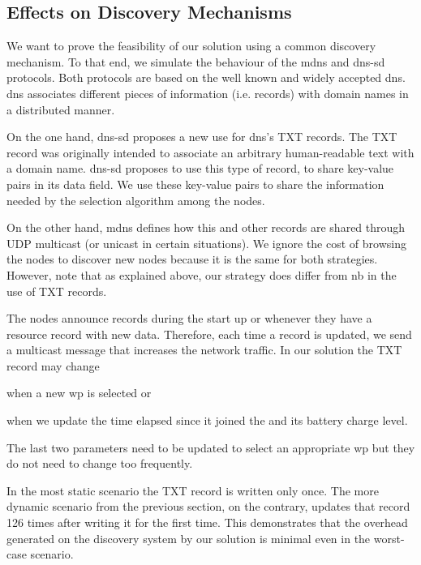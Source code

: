 \subsection{Effects on Discovery Mechanisms}
\label{sec:mdns}

We want to prove the feasibility of our solution using a common discovery mechanism.
To that end, we simulate the behaviour of the \ac{mdns} and \ac{dns-sd}  protocols.
Both protocols are based on the well known and widely accepted \ac{dns}.
\ac{dns} associates different pieces of information (i.e. records) with domain names in a distributed manner.

On the one hand, \ac{dns-sd} proposes a new use for \ac{dns}'s TXT records.
The TXT record was originally intended to associate an arbitrary human-readable text with a domain name.
\ac{dns-sd} proposes to use this type of record, to share key-value pairs in its data field.
We use these key-value pairs to share the information needed by the selection algorithm among the nodes.

On the other hand, \ac{mdns} defines how this and other records are shared through UDP multicast (or unicast in certain situations).
We ignore the cost of browsing the nodes to discover new nodes because it is the same for both strategies.
However, note that as explained above, our strategy does differ from \acl{nb} in the use of TXT records.

The nodes announce records during the start up or whenever they have a resource record with new data.
Therefore, each time a record is updated, we send a multicast message that increases the network traffic.
In our solution the TXT record may change 
\begin{enumerate*}[label=\itshape(\arabic*\upshape)]
  \item when a new \ac{wp} is selected or
  \item when we update the time elapsed since it joined the \Space{} and its battery charge level.
\end{enumerate*}
The last two parameters need to be updated to select an appropriate \ac{wp} but they do not need to change too frequently.

In the most static scenario the TXT record is written only once.
The more dynamic scenario from the previous section, on the contrary, updates that record 126 times after writing it for the first time.
This demonstrates that the overhead generated on the discovery system by our solution is minimal even in the worst-case scenario.